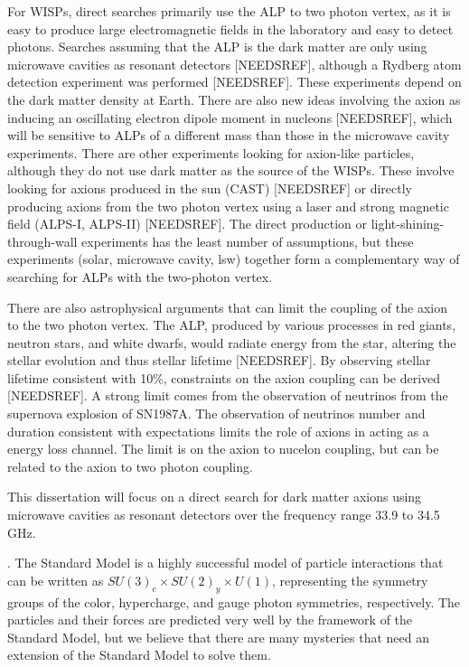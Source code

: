 \documentclass[11pt]{book}
\begin{document}
For WISPs, direct searches primarily use the ALP to two photon vertex, as it is easy to produce large electromagnetic fields in the laboratory and easy to detect photons. Searches assuming that the ALP is the dark matter are only using microwave cavities as resonant detectors [NEEDSREF], although a Rydberg atom detection experiment was performed [NEEDSREF]. These experiments depend on the dark matter density at Earth. There are also new ideas involving the axion as inducing an oscillating electron dipole moment in nucleons [NEEDSREF], which will be sensitive to  ALPs of a different mass than those in the microwave cavity experiments. There are other experiments looking for axion-like particles, although they do not use dark matter as the source of the WISPs. These involve looking for axions produced in the sun (CAST) [NEEDSREF] or directly producing axions from the two photon vertex using a laser and strong magnetic field (ALPS-I, ALPS-II) [NEEDSREF]. The direct production or light-shining-through-wall experiments has the least number of assumptions, but these experiments (solar, microwave cavity, lsw) together form a complementary way of searching for ALPs with the two-photon vertex.

There are also astrophysical arguments that can limit the coupling of the axion to the two photon vertex. The ALP, produced by various processes in red giants, neutron stars, and white dwarfs, would radiate energy from the star, altering the stellar evolution and thus stellar lifetime [NEEDSREF]. By observing stellar lifetime consistent with 10$\%$, constraints on the axion coupling can be derived [NEEDSREF]. A strong limit comes from the observation of neutrinos from the supernova explosion of SN1987A. The observation of neutrinos number and duration consistent with expectations limits the role of axions in acting as a energy loss channel. The limit is on the axion to nucelon coupling, but can be related to the axion to two photon coupling.

This dissertation will focus on a direct search for dark matter axions using microwave cavities as resonant detectors over the frequency range 33.9 to 34.5 GHz.







.
The Standard Model is a highly successful model of particle interactions that can be written as $SU(3)_c \times SU(2)_y \times U(1)$, representing the symmetry groups of the color, hypercharge, and gauge photon symmetries, respectively. The particles and their forces are predicted very well by the framework of the Standard Model, but we believe that there are many mysteries that need an extension of the Standard Model to solve them.
\end{document}
